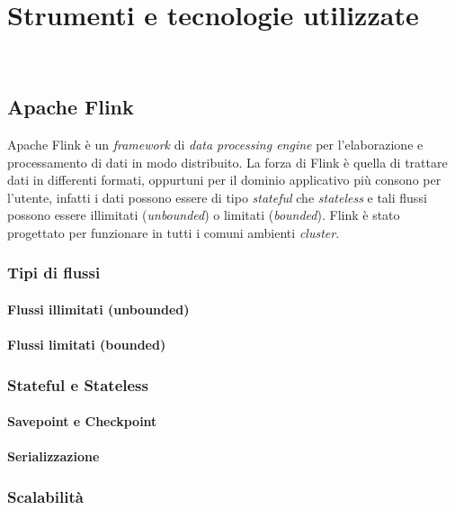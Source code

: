 
\chapter{Strumenti e tecnologie utilizzate}
\label{cap:strumenti-tecnologie}


\\

\section{Apache Flink}
Apache Flink è un \textit{framework} di \textit{data processing engine} per l'elaborazione e processamento di dati in modo distribuito.
La forza di Flink è quella di trattare dati in differenti formati, oppurtuni per il dominio applicativo più consono per l'utente, infatti i dati possono essere di tipo \textit{stateful} che \textit{stateless} e tali flussi possono essere illimitati (\textit{unbounded}) o limitati (\textit{bounded}). Flink è stato progettato per funzionare in tutti i comuni ambienti \textit{cluster}.

\subsection{Tipi di flussi}
\subsubsection{Flussi illimitati (unbounded)}
\subsubsection{Flussi limitati (bounded)}

\subsection{Stateful e Stateless}

\subsubsection{Savepoint e Checkpoint}

\subsubsection{Serializzazione}

\subsection{Scalabilità}

